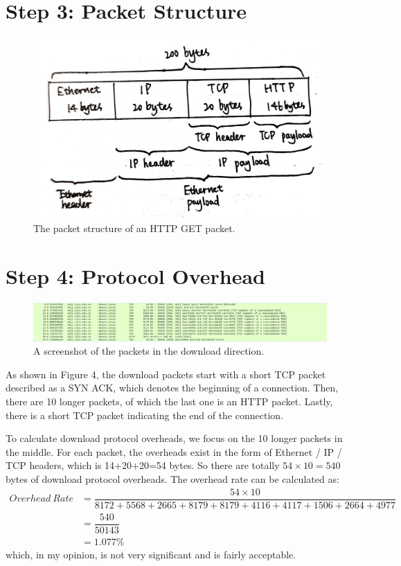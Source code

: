 \documentclass[a4paper]{article}
\begin{document}
\section{Step 3: Packet Structure}
\begin{figure}[htbp]
\centering
\includegraphics[scale=0.15]{3.jpg}
\caption{The packet structure of an HTTP GET packet.}
\end{figure}

\section{Step 4: Protocol Overhead}
\begin{figure}[htbp]
\centering
\includegraphics[scale=0.5]{4.jpg}
\caption{A screenshot of the packets in the download direction.}
\end{figure}
As shown in Figure 4, the download packets start with a short TCP packet described as a SYN ACK, which denotes the beginning of a connection. Then, there are 10 longer packets, of which the last one is an HTTP packet. Lastly, there is a short TCP packet indicating the end of the connection.
\par
To calculate download protocol overheads, we focus on the 10 longer packets in the middle. For each packet, the overheads exist in the form of Ethernet / IP / TCP headers, which is 14+20+20=54 bytes. So there are totally $54\times10=540$ bytes of download protocol overheads. The overhead rate can be calculated as:
\begin{align*}
Overhead\ Rate &=\dfrac{54\times10}{8172+5568+2665+8179+8179+4116+4117+1506+2664+4977}\\
&=\dfrac{540}{50143}\\
&=1.077\%
\end{align*}
which, in my opinion, is not very significant and is fairly acceptable.
\end{document}

